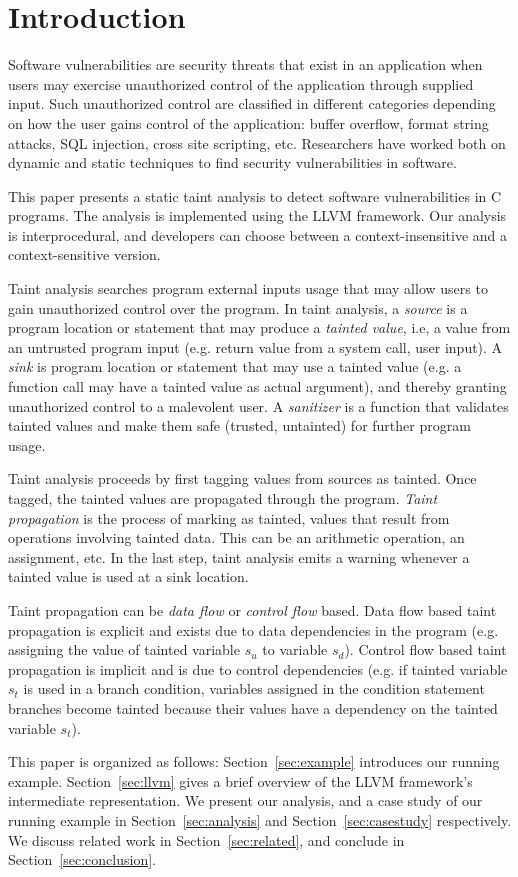 \section{Introduction}
Software vulnerabilities are security threats
that exist in an application when users may exercise
unauthorized  control of the application through supplied input.
Such unauthorized control are classified in different
categories depending on how the user gains control of
the application: buffer overflow, format string attacks,
SQL injection, cross site scripting, etc.
Researchers have worked both on dynamic \cite{Clause:2007:Dytan,
Kiezun:2009:Ardilla} and static techniques 
\cite{Jovanovic:2006:Pixy, Shankar:2001:DFS, livshits05finding, 
Avots:2005:ISS, Dimitru:2009:STAC, Tripp:2009:TET} to find 
security vulnerabilities in software. 

This paper presents a static taint analysis to detect software
vulnerabilities in C programs. The analysis is implemented
using the LLVM framework\cite{Lattner:2004:LLVM}. Our analysis
is interprocedural, and developers can choose between a
context-insensitive and a context-sensitive version. 

Taint analysis searches program external inputs usage that
may allow users to gain unauthorized control over the program. 
In taint analysis, a \textit{source} is a program location
or statement that may produce a \textit{tainted value}, i.e,
a value from an untrusted program input (e.g. return value from a
system call, user input). 
A \textit{sink} is program location or statement that may use
a tainted value (e.g. a function call may have a tainted value as
actual argument), and thereby granting unauthorized control
to a malevolent user.
A \textit{sanitizer} is a function that validates tainted
values and make them safe (trusted, untainted) for further
program usage.

Taint analysis proceeds by first tagging values from sources
as tainted. Once tagged, the tainted values are propagated
through the program.
\textit{Taint propagation} is the process of marking as tainted, 
values that result from operations involving tainted data. This
can be an arithmetic operation, an assignment, etc. In the
last step, taint analysis emits a warning whenever a tainted
value is used at a sink location.

Taint propagation can be \textit{data flow} or \textit{control flow}
based. Data flow based taint propagation is explicit and exists
due to data dependencies in the program (e.g. assigning the value
of tainted variable $s_u$ to variable $s_d$).
Control flow based taint propagation is implicit and is due to
control dependencies (e.g. if tainted variable $s_t$ is used in a branch
condition, variables assigned in the condition statement branches
become tainted because their values have a dependency on the
tainted variable $s_t$).

This paper is organized as follows: Section~\ref{sec:example}
introduces our running example. Section~\ref{sec:llvm} gives
a brief overview of the LLVM framework's intermediate
representation. We present our analysis, and a case study of
our running example in Section~\ref{sec:analysis} and
Section~\ref{sec:casestudy} respectively. We discuss related
work in Section~\ref{sec:related}, and conclude in
Section~\ref{sec:conclusion}.